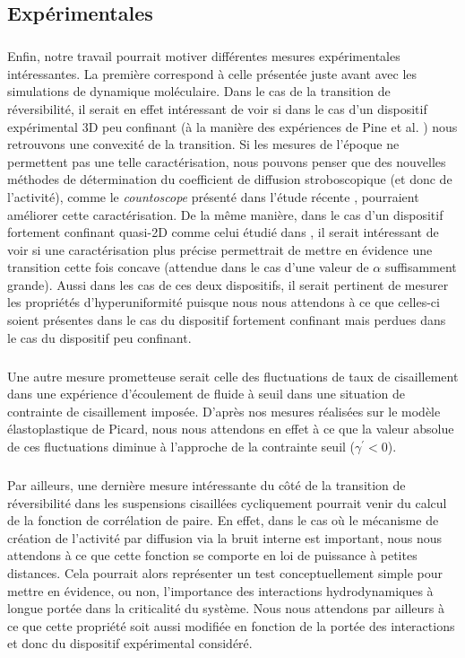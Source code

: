 \subsection*{Expérimentales}

\subparagraph{}Enfin, notre travail pourrait motiver différentes mesures expérimentales intéressantes. La première correspond à celle présentée juste avant avec les simulations de dynamique moléculaire. Dans le cas de la transition de réversibilité, il serait en effet intéressant de voir si dans le cas d'un dispositif expérimental 3D peu confinant (à la manière des expériences de Pine et al. \cite{pine_chaos_2005}) nous retrouvons une convexité de la transition. Si les mesures de l'époque ne permettent pas une telle caractérisation, nous pouvons penser que des nouvelles méthodes de détermination du coefficient de diffusion stroboscopique (et donc de l'activité), comme le \textit{countoscope} présenté dans l'étude récente \cite{mackay_countoscope_2024}, pourraient améliorer cette caractérisation. De la même manière, dans le cas d'un dispositif fortement confinant quasi-2D comme celui étudié dans \cite{jeanneret_geometrically_2014, weijs_emergent_2015}, il serait intéressant de voir si une caractérisation plus précise permettrait de mettre en évidence une transition cette fois concave (attendue dans le cas d'une valeur de $\alpha$ suffisamment grande). Aussi dans les cas de ces deux dispositifs, il serait pertinent de mesurer les propriétés d'hyperuniformité puisque nous nous attendons à ce que celles-ci soient présentes dans le cas du dispositif fortement confinant mais perdues dans le cas du dispositif peu confinant.

\subparagraph{}Une autre mesure prometteuse serait celle des fluctuations de taux de cisaillement dans une expérience d'écoulement de fluide à seuil dans une situation de contrainte de cisaillement imposée. D'après nos mesures réalisées sur le modèle élastoplastique de Picard, nous nous attendons en effet à ce que la valeur absolue de ces fluctuations diminue à l'approche de la contrainte seuil ($\gamma^\prime < 0$).

\subparagraph{}Par ailleurs, une dernière mesure intéressante du côté de la transition de réversibilité dans les suspensions cisaillées cycliquement pourrait venir du calcul de la fonction de corrélation de paire. En effet, dans le cas où le mécanisme de création de l'activité par diffusion via la bruit interne est important, nous nous attendons à ce que cette fonction se comporte en loi de puissance à petites distances. Cela pourrait alors représenter un test conceptuellement simple pour mettre en évidence, ou non, l'importance des interactions hydrodynamiques à longue portée dans la criticalité du système. Nous nous attendons par ailleurs à ce que cette propriété soit aussi modifiée en fonction de la portée des interactions et donc du dispositif expérimental considéré.

